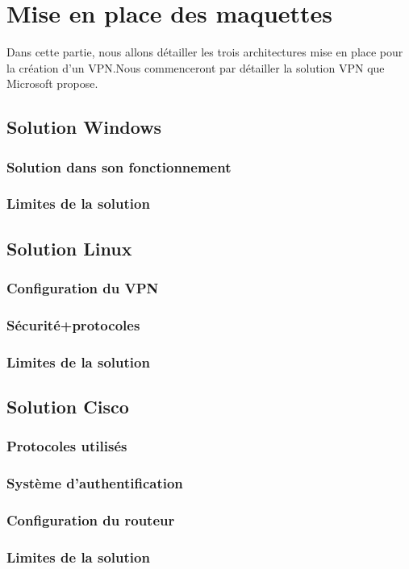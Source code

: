 \section{Mise en place des maquettes}

	Dans cette partie, nous allons détailler les trois architectures mise en place pour la création d'un VPN.Nous commenceront par détailler la solution VPN que Microsoft propose.

\subsection{Solution Windows}





\subsubsection{Solution dans son fonctionnement}
\subsubsection{Limites de la solution}

\subsection{Solution Linux}
\subsubsection{Configuration du VPN}
\subsubsection{Sécurité+protocoles}
\subsubsection{Limites de la solution}



\subsection{Solution Cisco}
\subsubsection{Protocoles utilisés}
\subsubsection{Système d'authentification}
\subsubsection{Configuration du routeur}
\subsubsection{Limites de la solution}



\pagebreak
